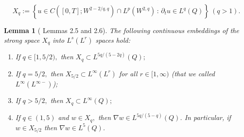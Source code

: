 \documentclass[11pt,reqno]{amsart}%
\newtheorem{lemma}[theorem]{Lemma}
\numberwithin{equation}{section}
\begin{document}
\begin{equation}\label{spaceX}
X_q:=\left\{u\in C([0,T];W^{2-2/q,q})\cap L^p(W^{2,q})\,:\, \partial_tu\in L^q(Q)\right\}\ (q>1).
\end{equation}
\begin{lemma}[\cite{Andre_SICOM} Lemmas 2.5 and 2.6]\label{An}  
The following continuous embeddings of the strong space $X_q$ into $L^s(L^r)$ spaces hold:
\begin{enumerate}
\item If $q\in [1,5/2),$ then $X_q\subset L^{5q/(5-2q)}(Q);$
\item If $q=5/2,$ then  $X_{5/2}\subset L^{\infty}(L^r)$ for all $r\in [1,\infty)$ (that we called $L^{\infty}(L^{\infty-})$);
\item If $q>5/2,$ then $X_q\subset L^\infty(Q);$
\item If $q\in(1,5)$ and $w\in X_q,$ then $\nabla w\in L^{5q/(5-q)}(Q)$. In particular, if  $w\in X_{5/2}$ then $\nabla w\in L^{5}(Q)$.
\end{enumerate}
\end{lemma}

%
\end{document}
